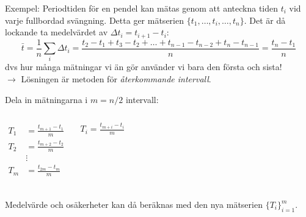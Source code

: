 \documentclass[9pt]{beamer}
\newcommand*\mean[1]{\bar{#1}}
\begin{document}
    \begin{frame}
        \onslide<+->
        Exempel: Periodtiden för en pendel kan mätas genom att anteckna tiden $t_i$ vid varje fullbordad svängning.
        Detta ger mätserien $\{t_1, \ldots, t_i, \ldots, t_n\}$. Det är då lockande ta medelvärdet av
        $\Delta t_i = t_{i+1} - t_{i}$:
        \begin{equation*}
            \mean{t} = \frac1n \sum_i \Delta t_i = \frac{t_2 - t_1 + t_3 - t_2 + \ldots + t_{n-1} - t_{n-2} + t_n - t_{n-1}}{n} = \frac{t_n - t_1}{n}
        \end{equation*}
        dvs hur många mätningar vi än gör använder vi bara den första och sista!\\
        $\rightarrow$ Lösningen är metoden för \emph{återkommande intervall}.

        \vfill

        \onslide<+->
        Dela in mätningarna i $m=n/2$ intervall:
        \begin{columns}
            \begin{align*}
                T_1 &= \frac{t_{m+1} - t_1}{m}\\
                T_2 &= \frac{t_{m+2} - t_2}{m}\\
                    &\vdots\\
                T_m &= \frac{t_{2m} - t_m}{m}\\
            \end{align*}
            $T_i = \frac{t_{m+i} - t_i}{m}$
        \end{columns}
    Medelvärde och osäkerheter kan då beräknas med den nya mätserien $\{T_i\}_{i=1}^m$.
    \end{frame}
\end{document}
